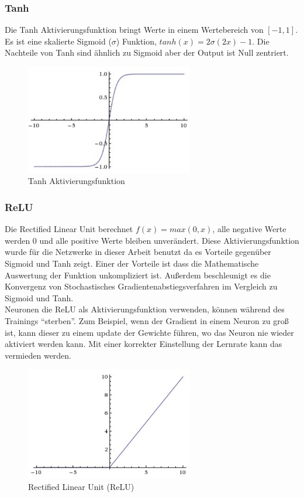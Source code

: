 \subsubsection{Tanh}
Die Tanh Aktivierungsfunktion bringt Werte in einem Wertebereich von $ [-1, 1] $. Es ist eine skalierte Sigmoid ($ \sigma $) Funktion,
$ tanh(x) = 2\sigma(2x) - 1 $. Die Nachteile von Tanh sind ähnlich zu Sigmoid aber der Output ist Null zentriert.

\begin{figure}[H]
  \centering
  \includegraphics[width=0.65\textwidth]{resources/nn/tanh.png}
  \caption{
    Tanh Aktivierungsfunktion 
    \cite{neuron-model}
  }
  \label{image:tanh}
\end{figure}

\subsubsection{ReLU}
Die Rectified Linear Unit berechnet $ f(x) = max(0, x) $, alle negative Werte werden 0 und alle positive Werte bleiben unverändert. Diese Aktivierungsfunktion
wurde für die Netzwerke in dieser Arbeit benutzt da es Vorteile gegenüber Sigmoid und Tanh zeigt. Einer der Vorteile ist dass die Mathematische
Auswertung der Funktion unkompliziert ist. Außerdem beschleunigt es die Konvergenz von Stochastisches Gradientenabstiegsverfahren im Vergleich zu Sigmoid
und Tanh.
\\
Neuronen die ReLU als Aktivierungsfunktion verwenden, können während des Trainings ``sterben''. Zum Beispiel, wenn der Gradient in einem Neuron
zu groß ist, kann dieser zu einem update der Gewichte führen, wo das Neuron nie wieder aktiviert werden kann. Mit einer korrekter Einstellung der
Lernrate kann das vermieden werden. \cite{cs231-neural-networks}

\begin{figure}[H]
  \centering
  \includegraphics[width=0.65\textwidth]{resources/nn/relu.jpeg}
  \caption{
    Rectified Linear Unit (ReLU) 
    \cite{neuron-model}
  }
  \label{image:relu}
\end{figure}

